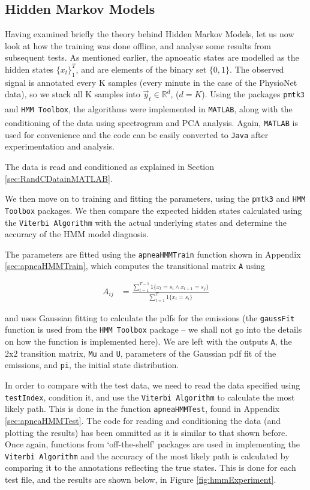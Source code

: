 \subsection{Hidden Markov Models}
\label{sec:hmmExperiments-sachin}

Having examined briefly the theory behind Hidden Markov Models, let us now look at how the training was done offline, and analyse some results from subsequent tests. As mentioned earlier, the apnoeatic states are modelled as the hidden states $\{x_t\}_1^T$, and are elements of the binary set $\{0, 1\}$. The observed signal is annotated every K samples (every minute in the case of the PhysioNet data), so we stack all K samples into $\vec y_t \in \mathbb{R}^d$, ($d = K$). Using the packages \verb!pmtk3! and \verb!HMM Toolbox!, the algorithms were implemented in \verb!MATLAB!\textsuperscript{\textregistered}, along with the conditioning of the data using spectrogram and PCA analysis. Again, \verb!MATLAB!\textsuperscript{\textregistered} is used for convenience and the code can be easily converted to \verb!Java! after experimentation and analysis.

The data is read and conditioned as explained in Section \ref{sec:RandCDatainMATLAB}.

We then move on to training and fitting the parameters, using the \verb!pmtk3! and \verb!HMM Toolbox! packages. We then compare the expected hidden states calculated using the \verb!Viterbi Algorithm! with the actual underlying states and determine the accuracy of the HMM model diagnosis.

The parameters are fitted using the \verb!apneaHMMTrain! function shown in Appendix \ref{sec:apneaHMMTrain}, which computes the transitional matrix \verb!A! using

\begin{align}
		A_{ij} & = \frac{\sum_{t = 1}^{T - 1} 1\{x_t = s_i \land x_{t + 1} = s_j\}}{\sum_{t = 1}^{T} 1\{x_t = s_i\}}
\end{align}

and uses Gaussian fitting to calculate the pdfs for the emissions (the \verb!gaussFit! function is used from the \verb!HMM Toolbox! package -- we shall not go into the details on how the function is implemented here). We are left with the outputs \verb!A!, the 2x2 transition matrix, \verb!Mu! and \verb!U!, parameters of the Gaussian pdf fit of the emissions, and \verb!pi!, the initial state distribution.

In order to compare with the test data, we need to read the data specified using \verb!testIndex!, condition it, and use the \verb!Viterbi Algorithm! to calculate the most likely path. This is done in the function \verb!apneaHMMTest!, found in Appendix \ref{sec:apneaHMMTest}. The code for reading and conditioning the data (and plotting the results) has been ommitted as it is similar to that shown before. Once again, functions from `off-the-shelf' packages are used in implementing the \verb!Viterbi Algorithm! and the accuracy of the most likely path is calculated by comparing it to the annotations reflecting the true states. This is done for each test file, and the results are shown below, in Figure \ref{fig:hmmExperiment}.

